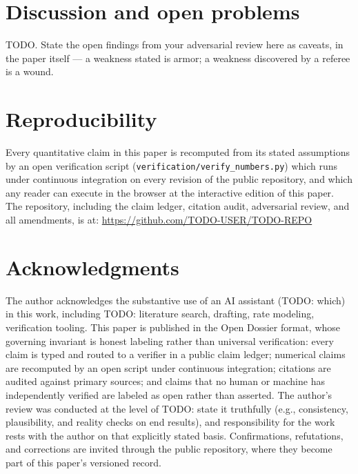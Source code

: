 \documentclass[11pt]{article}
\begin{document}
\section{Discussion and open problems}
TODO. State the open findings from your adversarial review here as
caveats, in the paper itself — a weakness stated is armor; a weakness
discovered by a referee is a wound.

%

\section*{Reproducibility}
Every quantitative claim in this paper is recomputed from its stated
assumptions by an open verification script
(\texttt{verification/verify\_numbers.py}) which runs under continuous
integration on every revision of the public repository, and which any
reader can execute in the browser at the interactive edition of this
paper. The repository, including the claim ledger, citation audit,
adversarial review, and all amendments, is at:
\url{https://github.com/TODO-USER/TODO-REPO}

\section*{Acknowledgments}
The author acknowledges the substantive use of an AI assistant (TODO:
which) in this work, including TODO: literature search, drafting, rate
modeling, verification tooling. This paper is published in the Open
Dossier format, whose governing invariant is honest labeling rather than
universal verification: every claim is typed and routed to a verifier in
a public claim ledger; numerical claims are recomputed by an open script
under continuous integration; citations are audited against primary
sources; and claims that no human or machine has independently
verified are labeled as open rather than asserted. The author's review
was conducted at the level of TODO: state it truthfully (e.g.,
consistency, plausibility, and reality checks on end results), and
responsibility for the work rests with the author on that explicitly
stated basis. Confirmations, refutations, and corrections are invited
through the public repository, where they become part of this paper's
versioned record.
\end{document}
